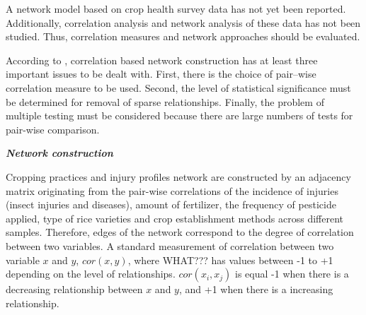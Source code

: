 
A network model based on crop health survey data has not yet been reported. Additionally, correlation analysis and network analysis of these data has not been studied. Thus, correlation measures and network approaches should be evaluated.

According to , correlation based network construction has at least three important issues to be dealt with. First, there is the choice of pair--wise correlation measure to be used. Second, the level of statistical significance must be determined for removal of sparse relationships. Finally, the problem of multiple testing must be considered because there are large numbers of tests for pair-wise comparison.




\textit{\textbf{Network construction}}

Cropping practices and injury profiles network are constructed by an adjacency matrix originating from the pair-wise correlations of the incidence of injuries (insect injuries and diseases), amount of fertilizer, the frequency of pesticide applied, type of rice varieties and crop establishment methods across different samples. Therefore, edges of the network correspond to the degree of correlation between two variables. A standard measurement of correlation between two variable $x$ and $y$, $cor(x,y)$, where WHAT??? has values between -1 to +1 depending on the level of relationships. $cor(x_{i}, x_{j})$ is equal -1 when there is a decreasing relationship between $x$ and $y$, and +1 when there is a increasing relationship.

